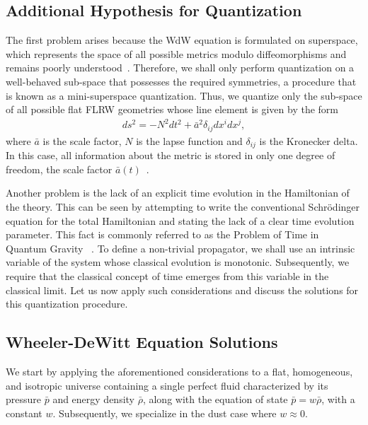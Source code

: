 \documentclass[a4paper,11pt]{article}
\begin{document}
\subsection{Additional Hypothesis for Quantization}
        

    The first problem arises because the WdW equation is formulated on superspace, which represents the space of all possible metrics modulo diffeomorphisms and remains poorly understood~\cite{halliwell1990introductory,dewitt1967}. Therefore, we shall only perform quantization on a well-behaved sub-space that possesses the required symmetries, a procedure that is known as a mini-superspace quantization. Thus, we quantize only the sub-space of all possible flat FLRW geometries whose line element is given by the form
        \begin{align}
        \label{physmetric}
            ds^2 = -N^{2}dt^2 + \bar{a}^2 \delta_{ij}dx^i dx^j 
        ,\end{align}
    where $\bar{a}$ is the scale factor, $N$ is the lapse function and $\delta_{ij}$ is the Kronecker delta. In this case, all information about the metric is stored in only one degree of freedom, the scale factor $\bar{a}(t)$~\cite{nelson2021bouncing}.
        
Another problem is the lack of an explicit time evolution in the Hamiltonian of the theory. This can be seen by attempting to write the conventional Schrödinger equation for the total Hamiltonian and stating the lack of a clear time evolution parameter. This fact is commonly referred to as the Problem of Time in Quantum Gravity ~\cite
{patrick_time_review,nelson_peter_bouncing_original,bianchi_time}. To define a non-trivial propagator, we shall use an intrinsic variable of the system whose classical evolution is monotonic. Subsequently, we require that the classical concept of time emerges from this variable in the classical limit. Let us now apply such considerations and discuss the solutions for this quantization procedure.

\subsection{Wheeler-DeWitt Equation Solutions}
    We start by applying the aforementioned considerations to a flat, homogeneous, and isotropic universe containing a single perfect fluid characterized by its pressure $\bar{p}$ and energy density $\bar{\rho}$, along with the equation of state $\bar{p} = w\bar{\rho}$, with a constant $w$. Subsequently, we specialize in the dust case where $w \approx 0$. 
    
\end{document}
